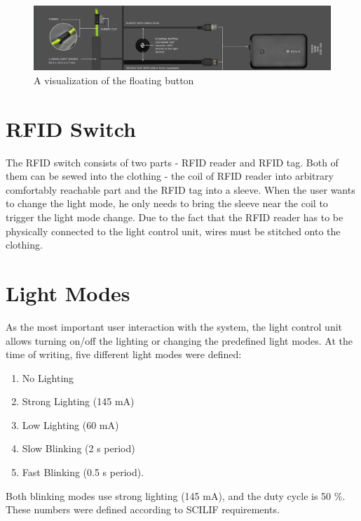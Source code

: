         \begin{figure}[!ht]
            \centering
    	    \includegraphics[width =1.1\textwidth]{URS/Figs/scilif_system02.png}
            \caption {A visualization of the floating button}
            \label{figure:scilif_fb}
        \end{figure}  
       
    \section{RFID Switch}
        The RFID switch consists of two parts - RFID reader and RFID tag. Both of them can be sewed into the clothing - the coil of RFID reader into arbitrary comfortably reachable part and the RFID tag into a sleeve. When the user wants to change the light mode, he only needs to bring the sleeve near the coil to trigger the light mode change. Due to the fact that the RFID reader has to be physically connected to the light control unit, wires must be stitched onto the clothing. 
       
       
    \section{Light Modes}  
    \label{sec:light_modes}
        As the most important user interaction with the system, the light control unit allows turning on/off the lighting or changing the predefined light modes. At the time of writing, five different light modes were defined:
        
        \begin{enumerate}
            \item No Lighting 
            \item Strong Lighting (145 mA)
            \item Low Lighting (60 mA)
            \item Slow Blinking (2 s period)
            \item Fast Blinking (0.5 s period).
        \end{enumerate}
        
        Both blinking modes use strong lighting (145 mA), and the duty cycle is 50 \%. These numbers were defined according to SCILIF requirements.
        
